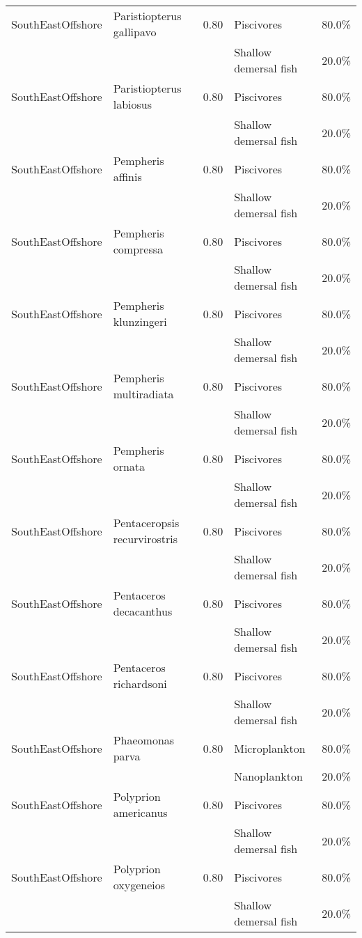\begin{longtable}{llcll}
\hline
SouthEastOffshore & Paristiopterus gallipavo & 0.80 & Piscivores & 80.0\% \\
& & & Shallow demersal fish & 20.0\% \\
\hline
SouthEastOffshore & Paristiopterus labiosus & 0.80 & Piscivores & 80.0\% \\
& & & Shallow demersal fish & 20.0\% \\
\hline
SouthEastOffshore & Pempheris affinis & 0.80 & Piscivores & 80.0\% \\
& & & Shallow demersal fish & 20.0\% \\
\hline
SouthEastOffshore & Pempheris compressa & 0.80 & Piscivores & 80.0\% \\
& & & Shallow demersal fish & 20.0\% \\
\hline
SouthEastOffshore & Pempheris klunzingeri & 0.80 & Piscivores & 80.0\% \\
& & & Shallow demersal fish & 20.0\% \\
\hline
SouthEastOffshore & Pempheris multiradiata & 0.80 & Piscivores & 80.0\% \\
& & & Shallow demersal fish & 20.0\% \\
\hline
SouthEastOffshore & Pempheris ornata & 0.80 & Piscivores & 80.0\% \\
& & & Shallow demersal fish & 20.0\% \\
\hline
SouthEastOffshore & Pentaceropsis recurvirostris & 0.80 & Piscivores & 80.0\% \\
& & & Shallow demersal fish & 20.0\% \\
\hline
SouthEastOffshore & Pentaceros decacanthus & 0.80 & Piscivores & 80.0\% \\
& & & Shallow demersal fish & 20.0\% \\
\hline
SouthEastOffshore & Pentaceros richardsoni & 0.80 & Piscivores & 80.0\% \\
& & & Shallow demersal fish & 20.0\% \\
\hline
SouthEastOffshore & Phaeomonas parva & 0.80 & Microplankton & 80.0\% \\
& & & Nanoplankton & 20.0\% \\
\hline
SouthEastOffshore & Polyprion americanus & 0.80 & Piscivores & 80.0\% \\
& & & Shallow demersal fish & 20.0\% \\
\hline
SouthEastOffshore & Polyprion oxygeneios & 0.80 & Piscivores & 80.0\% \\
& & & Shallow demersal fish & 20.0\% \\

\end{longtable}
